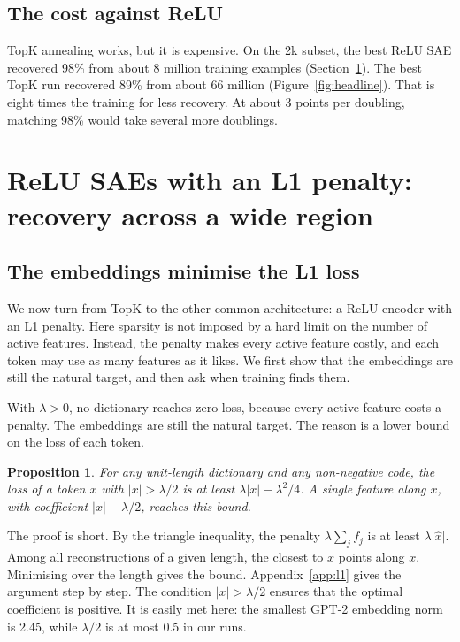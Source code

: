 \documentclass[11pt]{article}
\newtheorem{proposition}{Proposition}
\newcommand{\norm}[1]{\lvert #1\rvert}
\begin{document}
\subsection{The cost against ReLU}

TopK annealing works, but it is expensive. On the 2k subset, the best ReLU SAE recovered 98\% from about 8 million training examples (Section~\ref{sec:relu}). The best TopK run recovered 89\% from about 66 million (Figure~\ref{fig:headline}). That is eight times the training for less recovery. At about 3 points per doubling, matching 98\% would take several more doublings.

\section{ReLU SAEs with an L1 penalty: recovery across a wide region}
\label{sec:relu}

\subsection{The embeddings minimise the L1 loss}
\label{sec:relu-target}

We now turn from TopK to the other common architecture: a ReLU encoder with an L1 penalty. Here sparsity is not imposed by a hard limit on the number of active features. Instead, the penalty makes every active feature costly, and each token may use as many features as it likes. We first show that the embeddings are still the natural target, and then ask when training finds them.

With $\lambda > 0$, no dictionary reaches zero loss, because every active feature costs a penalty. The embeddings are still the natural target. The reason is a lower bound on the loss of each token.

\begin{proposition}\label{prop:l1}
For any unit-length dictionary and any non-negative code, the loss of a token $x$ with $\norm{x} > \lambda/2$ is at least $\lambda\norm{x} - \lambda^2/4$. A single feature along $x$, with coefficient $\norm{x} - \lambda/2$, reaches this bound.
\end{proposition}

The proof is short. By the triangle inequality, the penalty $\lambda\sum_j f_j$ is at least $\lambda\norm{\hat{x}}$. Among all reconstructions of a given length, the closest to $x$ points along $x$. Minimising over the length gives the bound. Appendix~\ref{app:l1} gives the argument step by step. The condition $\norm{x} > \lambda/2$ ensures that the optimal coefficient is positive. It is easily met here: the smallest GPT-2 embedding norm is 2.45, while $\lambda/2$ is at most 0.5 in our runs.
\end{document}
